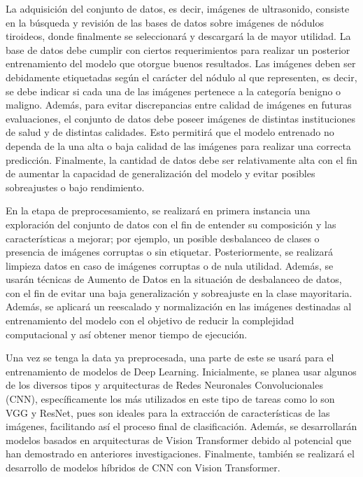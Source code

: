 La adquisición del conjunto de datos, es decir, imágenes de ultrasonido, consiste en la búsqueda y revisión de las bases de datos sobre imágenes de nódulos tiroideos, donde finalmente se seleccionará y descargará la de mayor utilidad. La base de datos debe cumplir con ciertos requerimientos para realizar un posterior entrenamiento del modelo que otorgue buenos resultados. Las imágenes deben ser debidamente etiquetadas según el carácter del nódulo al que representen, es decir, se debe indicar si cada una de las imágenes pertenece a la categoría benigno o maligno. Además, para evitar discrepancias entre calidad de imágenes en futuras evaluaciones, el conjunto de datos debe poseer imágenes de distintas instituciones de salud y de distintas calidades. Esto permitirá que el modelo entrenado no dependa de la una alta o baja calidad de las imágenes para realizar una correcta predicción. Finalmente, la cantidad de datos debe ser relativamente alta con el fin de aumentar la capacidad de generalización del modelo y evitar posibles sobreajustes o bajo rendimiento.  

En la etapa de preprocesamiento, se realizará en primera instancia una exploración del conjunto de datos con el fin de entender su composición y las características a mejorar; por ejemplo, un posible desbalanceo de clases o presencia de imágenes corruptas o sin etiquetar. Posteriormente, se realizará limpieza datos en caso de imágenes corruptas o de nula utilidad. Además, se usarán técnicas de Aumento de Datos en la situación de desbalanceo de datos, con el fin de evitar una baja generalización y sobreajuste en la clase mayoritaria. Además, se aplicará un reescalado y normalización en las imágenes destinadas al entrenamiento del modelo con el objetivo de reducir la complejidad computacional y así obtener menor tiempo de ejecución.

Una vez se tenga la data ya preprocesada, una parte de este se usará para el entrenamiento de modelos de Deep Learning. Inicialmente, se planea usar algunos de los diversos tipos y arquitecturas de Redes Neuronales Convolucionales (CNN), específicamente los más utilizados en este tipo de tareas como lo son VGG y ResNet, pues son ideales para la extracción de características de las imágenes, facilitando así el proceso final de clasificación. Además, se desarrollarán modelos basados en arquitecturas de Vision Transformer debido al potencial que han demostrado en anteriores investigaciones. Finalmente, también se realizará el desarrollo de modelos híbridos de CNN con Vision Transformer. %

